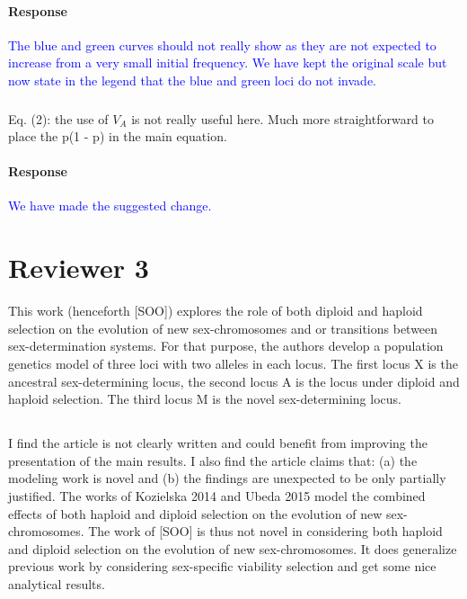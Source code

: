 \documentclass[10pt,letterpaper]{article}
\begin{document}
\noindent\paragraph{Response}
\textcolor{blue}{The blue and green curves should not really show as they are not expected to increase from a very small initial frequency. We have kept the original scale but now state in the legend that the blue and green loci do not invade.}

\noindent\subsubsection{}
Eq. (2): the use of $V_A$ is not really useful here. Much more straightforward to place the p(1 - p) in the main equation.

\noindent\paragraph{Response}
\textcolor{blue}{We have made the suggested change.}

\section{Reviewer 3}

This work (henceforth [SOO]) explores the role of both diploid and haploid selection on the evolution of new sex-chromosomes and or transitions between sex-determination systems. For that purpose, the authors develop a population genetics model of three loci with two alleles in each locus. The first locus X is the ancestral sex-determining locus, the second locus A is the locus under diploid and haploid selection. The third locus M is the novel sex-determining locus.

\noindent\subsection{}
I find the article is not clearly written and could benefit from improving the presentation of the main results. 
I also find the article claims that: (a) the modeling work is novel and (b) the findings are unexpected to be only partially justified.
The works of Kozielska 2014 and Ubeda 2015 model the combined effects of both haploid and diploid selection on the evolution of new sex-chromosomes. The work of [SOO] is thus not novel in considering both haploid and diploid selection on the evolution of new sex-chromosomes. It does generalize previous work by considering sex-specific viability selection and get some nice analytical results.
\end{document}
